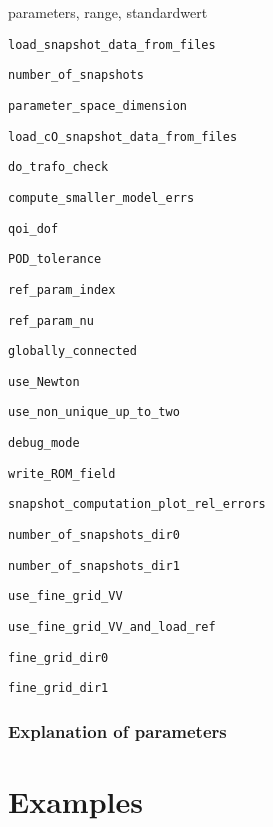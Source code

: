 \documentclass[a4paper,10pt]{article}
\begin{document}
parameters, range, standardwert

\verb|load_snapshot_data_from_files|


\verb|number_of_snapshots|

\verb|parameter_space_dimension|

\verb|load_cO_snapshot_data_from_files|

\verb|do_trafo_check|

\verb|compute_smaller_model_errs|

\verb|qoi_dof|

\verb|POD_tolerance|

\verb|ref_param_index|

\verb|ref_param_nu|

\verb|globally_connected|

\verb|use_Newton|

\verb|use_non_unique_up_to_two|

\verb|debug_mode|

\verb|write_ROM_field|

\verb|snapshot_computation_plot_rel_errors|


\verb|number_of_snapshots_dir0|


\verb|number_of_snapshots_dir1|

\verb|use_fine_grid_VV|

\verb|use_fine_grid_VV_and_load_ref|


\verb|fine_grid_dir0|


\verb|fine_grid_dir1|





\subsubsection{Explanation of parameters}



\section{Examples}
\end{document}
